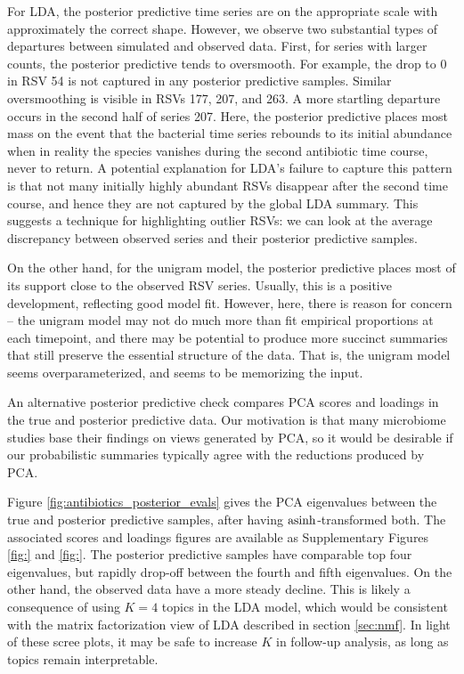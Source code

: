 \documentclass[oupdraft]{bio}
\begin{document}
For LDA, the posterior predictive time series are on the appropriate scale
with approximately the correct shape. However, we observe two substantial types
of departures between simulated and observed data. First, for series with larger
counts, the posterior predictive tends to oversmooth. For example, the drop to 0
in RSV 54 is not captured in any posterior predictive samples. Similar
oversmoothing is visible in RSVs 177, 207, and 263. A more startling departure
occurs in the second half of series 207. Here, the posterior predictive places
most mass on the event that the bacterial time series rebounds to its initial
abundance when in reality the species vanishes during the second antibiotic time
course, never to return. A potential explanation for LDA's failure to capture
this pattern is that not many initially highly abundant RSVs disappear after the
second time course, and hence they are not captured by the global LDA summary.
This suggests a technique for highlighting outlier RSVs: we can look at the
average discrepancy between observed series and their posterior predictive
samples.

On the other hand, for the unigram model, the posterior predictive places most
of its support close to the observed RSV series. Usually, this is a positive
development, reflecting good model fit. However, here, there is reason for
concern -- the unigram model may not do much more than fit empirical proportions
at each timepoint, and there may be potential to produce more succinct summaries
that still preserve the essential structure of the data. That is, the unigram
model seems overparameterized, and seems to be memorizing the input.

An alternative posterior predictive check compares PCA scores and loadings in
the true and posterior predictive data. Our motivation is that many microbiome
studies base their findings on views generated by PCA, so it would be desirable
if our probabilistic summaries typically agree with the reductions produced by
PCA.

Figure \ref{fig:antibiotics_posterior_evals} gives the PCA eigenvalues
between the true and posterior predictive samples, after having
$\mathop\mathrm{asinh}$-transformed both. The associated scores and loadings figures are
available as Supplementary Figures \ref{fig:} and \ref{fig:}. The posterior
predictive samples have comparable top four eigenvalues, but rapidly drop-off
between the fourth and fifth eigenvalues. On the other hand, the observed data
have a more steady decline. This is likely a consequence of using $K = 4$ topics
in the LDA model, which would be consistent with the matrix factorization view
of LDA described in section \ref{sec:nmf}. In light of these scree plots, it may
be safe to increase $K$ in follow-up analysis, as long as topics remain
interpretable.
\end{document}
